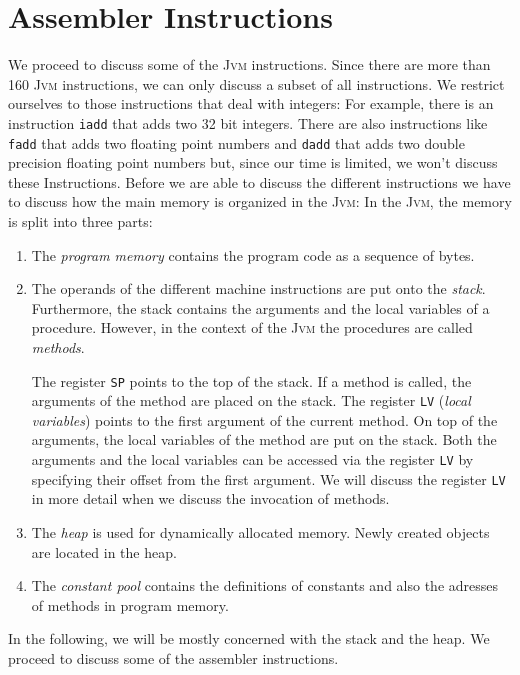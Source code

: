 \section{Assembler Instructions}
We proceed to discuss some of the \textsc{Jvm} instructions.  Since there are more than 160
\textsc{Jvm} instructions, we can only discuss a subset of all instructions.  We restrict ourselves to those
instructions that deal with integers:  For example, there is an instruction \texttt{iadd} that adds
two 32 bit integers.  There are also instructions like \texttt{fadd} that adds two floating point
numbers and \texttt{dadd} that adds two double precision floating point numbers but, since our time
is limited, we won't discuss
these Instructions.  Before we are able to discuss the different instructions we have to discuss how
the main 
memory is organized in the \textsc{Jvm}: In the \textsc{Jvm}, the memory is split into three parts:
\begin{enumerate}
\item The \emph{program memory} contains the program code as a sequence of bytes.
\item The operands of the different machine instructions are put onto the \emph{stack}.
      Furthermore, the stack contains the arguments and the local variables of a procedure.
      However, in the context of the \textsc{Jvm} the procedures are called \emph{methods}.

      The register \texttt{SP} points to the top of the stack.
      If a method is called, the arguments of the method are placed on the stack.  
      The register \texttt{LV} (\emph{local variables}) points to the first argument of the current  
      method.    On top of the arguments, the local variables of the method are put on the stack.
      Both the arguments and the local variables can be accessed via the register \texttt{LV}
      by specifying their offset from the first argument.
      We will discuss the register \texttt{LV} in more detail when we discuss the invocation of methods. 
\item The \emph{heap} is used for dynamically allocated memory.  Newly created objects are
      located in the heap.
\item The \emph{constant pool} contains the definitions of constants and also the adresses of
      methods in program memory.
\end{enumerate}
In the following, we will be mostly concerned with the stack and the heap.
We proceed to discuss some of the assembler instructions.

